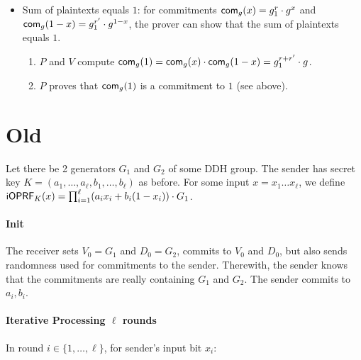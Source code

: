 \documentclass{article}
\begin{document}
\begin{itemize}
\item Sum of plaintexts equals $1$: for commitments
  $\mathsf{com}_{g}(x)=g_1^r\cdot{}g^x$ and
  $\mathsf{com}_{g}(1-x)=g_1^{r'}\cdot{}g^{1-x}$, the prover can show that the sum of
  plaintexts equals $1$.

  \begin{enumerate}
  \item $P$ and $V$ compute
    $\mathsf{com}_{g}(1)=\mathsf{com}_{g}(x)\cdot{}\mathsf{com}_{g}(1-x)=g_1^{r+r'}\cdot{}g$.
\item $P$ proves that $\mathsf{com}_{g}(1)$ is a commitment to $1$ (see
  above).
  \end{enumerate}
\end{itemize}


\newpage
\section{Old}
Let there be 2 generators $G_1$ and $G_2$ of some DDH group. The
sender has secret key $K=(a_1,\ldots,a_\ell,b_1,\ldots,b_\ell)$ as
before. For some input $x=x_1\ldots{}x_\ell$, we define
$\mathsf{i}\mathsf{OPRF}_K(x)=\prod_{i=1}^{\ell}(a_ix_i+b_i(1-x_i))\cdot{}G_1$.

\paragraph{Init}
The receiver sets $V_0 = G_1$ and $D_0 = G_2$, commits to $V_0$ and
$D_0$, but also sends randomness used for commitments to the
sender. Therewith, the sender knows that the commitments are really
containing $G_1$ and $G_2$. The sender commits to $a_i,b_i$.

\paragraph{Iterative Processing $\ell$ rounds}
In round $i\in\{1,\ldots,\ell\}$, for sender's input bit $x_i$:
\end{document}
